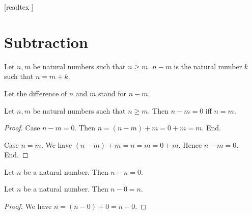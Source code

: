 \documentclass[10pt]{article}
\begin{document}
  \begin{imports}
    \begin{forthel}
      [readtex ]
    \end{forthel}
  \end{imports}


  \section*{Subtraction}

  \begin{forthel}
    \begin{definition}
      Let $n, m$ be natural numbers such that $n \geq m$.
      $n - m$ is the natural number $k$ such that $n = m + k$.
    \end{definition}

    Let the difference of $n$ and $m$ stand for $n - m$.
  \end{forthel}

  \begin{forthel}
    \begin{proposition}
      Let $n, m$ be natural numbers such that $n \geq m$.
      Then $n - m = 0$ iff $n = m$.
    \end{proposition}
    \begin{proof}
      Case $n - m = 0$.
        Then $n
          = (n - m) + m
          = 0 + m
          = m$.
      End.

      Case $n = m$.
        We have $(n - m) + m
          = n
          = m
          = 0 + m$.
        Hence $n - m = 0$.
      End.
    \end{proof}
  \end{forthel}

  \begin{forthel}
    \begin{corollary}
      Let $n$ be a natural number.
      Then $n - n = 0$.
    \end{corollary}
  \end{forthel}

  \begin{forthel}
    \begin{proposition}
      Let $n$ be a natural number.
      Then $n - 0 = n$.
    \end{proposition}
    \begin{proof}
      We have $n
        = (n - 0) + 0
        = n - 0$.
    \end{proof}
  \end{forthel}
\end{document}
